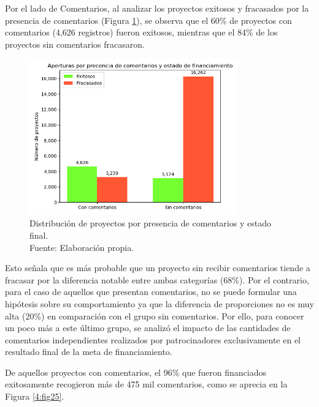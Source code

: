 Por el lado de Comentarios, al analizar los proyectos exitosos y fracasados por la presencia de comentarios (Figura \ref{4:fig24}), se observa que el 60\% de proyectos con comentarios (4,626 registros) fueron exitosos, mientras que el 84\% de los proyectos sin comentarios fracasaron.

\begin{figure}[!ht]
	\begin{center}
		\includegraphics[width=0.80\textwidth]{4/figures/projects comment by state.png}
		\caption[Distribución de proyectos por presencia de comentarios y estado final]{Distribución de proyectos por presencia de comentarios y estado final.\\
			Fuente: Elaboración propia.}
		\label{4:fig24}
	\end{center}
\end{figure}

Esto señala que es más probable que un proyecto sin recibir comentarios tiende a fracasar por la diferencia notable entre ambas categorías (68\%). Por el contrario, para el caso de aquellos que presentan comentarios, no se puede formular una hipótesis sobre su comportamiento ya que la diferencia de proporciones no es muy alta (20\%) en comparación con el grupo sin comentarios. Por ello, para conocer un poco más a este último grupo, se analizó el impacto de las cantidades de comentarios independientes realizados por patrocinadores exclusivamente en el resultado final de la meta de financiamiento.

\newpage
De aquellos proyectos con comentarios, el 96\% que fueron financiados exitosamente recogieron más de 475 mil comentarios, como se aprecia en la Figura \ref{4:fig25}.

